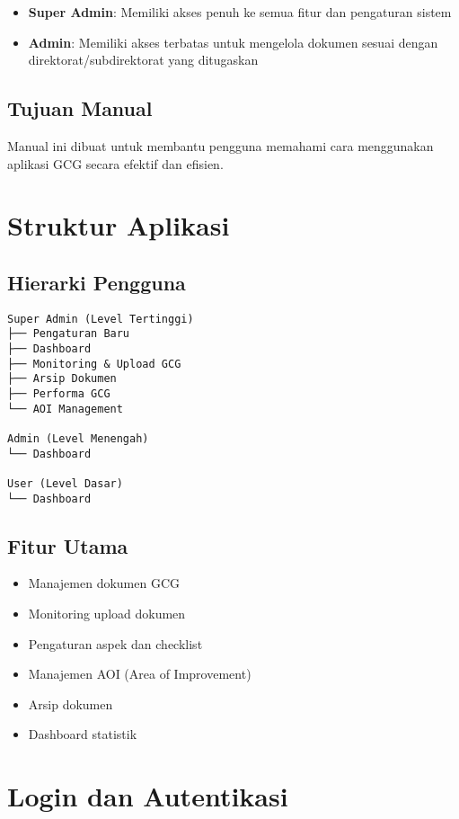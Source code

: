 \documentclass[12pt,a4paper]{article}
\begin{document}
\begin{itemize}
    \item \textbf{Super Admin}: Memiliki akses penuh ke semua fitur dan pengaturan sistem
    \item \textbf{Admin}: Memiliki akses terbatas untuk mengelola dokumen sesuai dengan direktorat/subdirektorat yang ditugaskan
\end{itemize}

\subsection{Tujuan Manual}
Manual ini dibuat untuk membantu pengguna memahami cara menggunakan aplikasi GCG secara efektif dan efisien.

\newpage

\section{Struktur Aplikasi}

\subsection{Hierarki Pengguna}
\begin{verbatim}
Super Admin (Level Tertinggi)
├── Pengaturan Baru
├── Dashboard
├── Monitoring & Upload GCG
├── Arsip Dokumen
├── Performa GCG
└── AOI Management

Admin (Level Menengah)
└── Dashboard

User (Level Dasar)
└── Dashboard
\end{verbatim}

\subsection{Fitur Utama}
\begin{itemize}
    \item Manajemen dokumen GCG
    \item Monitoring upload dokumen
    \item Pengaturan aspek dan checklist
    \item Manajemen AOI (Area of Improvement)
    \item Arsip dokumen
    \item Dashboard statistik
\end{itemize}

\newpage

\section{Login dan Autentikasi}
\end{document}
